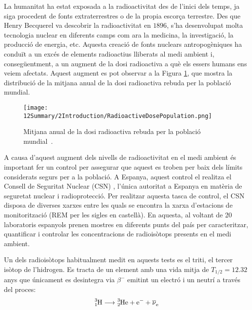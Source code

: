 La humanitat ha estat exposada a la radioactivitat des de l'inici dels temps, ja siga procedent de fonts extraterrestres o de la propia escorça terrestre. Des que Henry Becquerel va descobrir la radioactivitat en $1896$, s'ha desenvolupat molta tecnologia nuclear en diferents camps com ara la medicina, la investigació, la producció de energia, etc. Aquesta creació de fonts nuclears antropogèniques ha conduït a un excés de elements radioactius lliberats al medi ambient i, consegüentment, a un augment de la dosi radioactiva a què els essers humans ens veiem afectats. Aquest augment es pot observar a la Figura  \ref{fig:RadioactiveDosePopulation}, que mostra la distribució de la mitjana anual de la dosi radioactiva rebuda per la població mundial.

\begin{figure}[h]
\texttt{[image: 12Summary/2Introduction/RadioactiveDosePopulation.png]}
\centering
\caption{Mitjana anual de la dosi radioactiva rebuda per la població mundial~\cite{IAEA}\label{fig:RadioactiveDosePopulation}.}
\end{figure}

A causa d'aquest augment dels nivells de radioactivitat en el medi ambient és important fer un control per assegurar que aquest es troben per baix dels límits considerats segurs per a la població. A Espanya, aquest control el realitza el Consell de Seguritat Nuclear (CSN) \cite{CSN}, l'única autoritat a Espanya en matèria de seguretat nuclear i radioprotecció. Per realitzar aquesta tasca de control, el CSN disposa de diverses xarxes entre les quals se encontra la xarxa d'estacions de monitorització (REM per les sigles en castellà). En aquesta, al voltant de 20 laboratoris espanyols prenen mostres en diferents punts del país per caracteritzar, quantificar i controlar les concentracions de radioisòtops presents en el medi ambient.

Un dels radioisòtops habitualment medit en aquests tests es el triti, el tercer isòtop de l'hidrogen. Es tracta de un element amb una vida mitja de $T_{1/2} = 12.32$ anys que únicament es desintegra via $\beta^{-}$ emitint un electró i un neutrí a través del proces:
\begin{equation}
\ce{^{3}_{1}H} \longrightarrow \ce{^{3}_{2}He}  + \ce{e^-}  + \ce{\overline{\nu}_e}
\label{eq:DecaimentTriti}
\end{equation}

